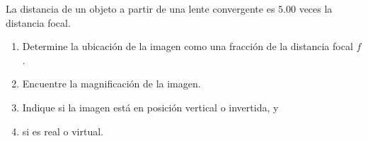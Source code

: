 \item La distancia de un objeto a partir de una lente convergente es $5.00$ veces la distancia focal.
\begin{enumerate}
    \item Determine la ubicación de la imagen como una fracción de la distancia focal $f$.
    \item Encuentre la magnificación de la imagen.
    \item Indique si la imagen está en posición vertical o invertida, y
    \item si es real o virtual.
\end{enumerate}